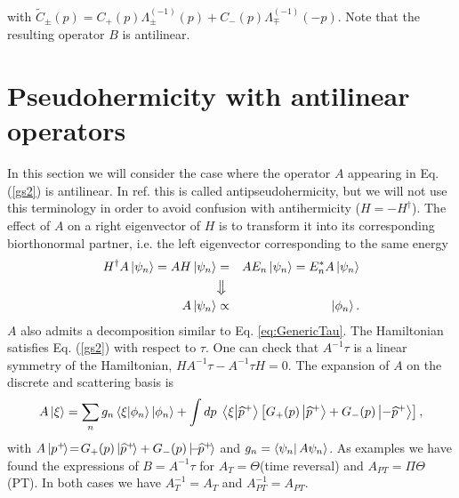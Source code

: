 %
with $\tilde{C}_\pm(p) = C_+(p)\Lambda_\pm^{(-1)}(p)+C_-(p)\Lambda_\mp^{(-1)}(-p)$. Note that the resulting operator $B$ is antilinear.

\section{Pseudohermicity with antilinear operators}

In this section we will consider the case where the operator $A$ appearing in Eq. (\ref{gs2}) is antilinear.  In ref. \cite{Mostafazadeh2002b} this is called antipseudohermicity, but we will not use this terminology in order to avoid confusion with antihermicity ($H = - H^\dagger$). The effect of $A$ on a right eigenvector of $H$ is to transform it  into its corresponding biorthonormal partner, i.e. the left eigenvector corresponding to the same energy
%
\begin{eqnarray}
    H^\dagger A \ket{\psi_n} = A H \ket{\psi_n}
    &=&A E_n\ket{\psi_n}
    = E_n^* A \ket{\psi_n}\nonumber\\
    &\big\Downarrow&\nonumber\\
    A\ket{\psi_n}&\propto&\ket{\phi_n}.
\end{eqnarray}
%
$A$ also admits a decomposition similar to Eq. \eqref{eq:GenericTau}.
The Hamiltonian satisfies Eq. (\ref{gs2})
with respect to $\tau$. One can check that $A^{-1}\tau$ is a linear symmetry of the Hamiltonian,
$HA^{-1}\tau - A^{-1}\tau H=0$. The expansion of $A$ on the discrete and scattering basis is
%
\begin{equation}
    A \ket{\xi} = \sum_n g_n \braket{\xi}{\phi_n} \ket{\phi_n} + \int dp \;  \braket{\xi}{\widehat{p}^+}   \left[ G_+(p) \ket{\widehat{p}^+} + G_-(p)\ket{-\widehat{p}^+} \right],
\end{equation}
%
with $A\ket{p^+\!}\!=\!G_+(p)\ket{\widehat{p}^+\!}+G_-(p)\ket{\!-\!\widehat{p}^+\!}$ and  $g_n = \bra{\psi_n}A {\psi_n}\rangle$.
As examples we have found the expressions of $B = A^{-1}\tau$ for $A_T = \Theta$(time reversal) and $A_{PT} = \Pi\Theta$ (PT). In both cases we have $A_T^{-1}=A_T$ and $A_{PT}^{-1}=A_{PT}$.
%
